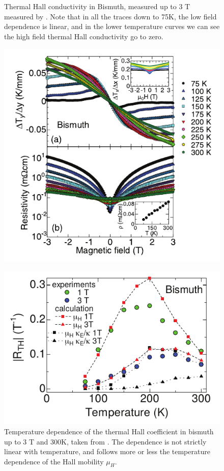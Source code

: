 \documentclass{thesis-umich}
\begin{document}
\begin{figure}
	\centering
	\begin{minipage}{.45\linewidth}
	\caption[Thermal Hall Conductivity in Bismuth up to 3 T]{Thermal Hall conductivity in Bismuth, measured up to 3 T measured by \cite{Kobayashi2012}. Note that in all the traces down to 75K, the low field dependence is linear, and in the lower temperature curves we can see the high field thermal Hall conductivity go to zero.}
	\label{fig:kobayashi1}
	\includegraphics[width=\linewidth]{figures/kobayashi12_fig1.pdf}
	\end{minipage}
	\hspace{.05\linewidth}
	\begin{minipage}{.45\linewidth}
		\caption[Temperature Dependence of $R_{TH}$ in Bismuth up to 3 T]{Temperature dependence of the thermal Hall coefficient in bismuth up to 3 T and 300K, taken from \cite{Kobayashi2012}. The dependence is not strictly linear with temperature, and follows more or less the temperature dependence of the Hall mobility $\mu_H$.}
	\label{fig:kobayashi2}
	\includegraphics[width=\linewidth]{figures/kobayashi12_fig2.pdf}
	\end{minipage}
\end{figure}
\end{document}
